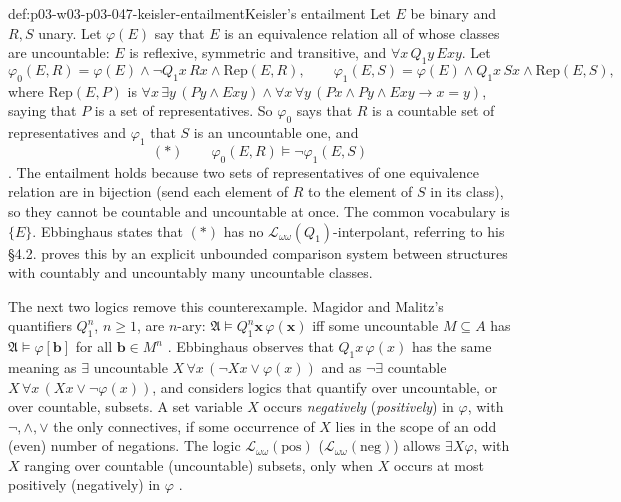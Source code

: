 \begin{hbexample}{def:p03-w03-p03-047-keisler-entailment}{Keisler's entailment}
Let \(E\) be binary and \(R,S\) unary.  Let \(\varphi(E)\) say that \(E\) is
an equivalence relation all of whose classes are uncountable:
\(E\) is reflexive, symmetric and transitive, and \(\forall x\,Q_1y\,Exy\).
Let
\[
 \varphi_0(E,R)=\varphi(E)\land\neg Q_1x\,Rx\land\mathrm{Rep}(E,R),\qquad
 \varphi_1(E,S)=\varphi(E)\land Q_1x\,Sx\land\mathrm{Rep}(E,S),
\]
where \(\mathrm{Rep}(E,P)\) is
\(\forall x\,\exists y\,(Py\land Exy)\land\forall x\,\forall y\,(Px\land Py\land Exy\to x=y)\),
saying that \(P\) is a set of representatives.  So \(\varphi_0\) says that
\(R\) is a countable set of representatives and \(\varphi_1\) that \(S\) is
an uncountable one, and
\[
 (\ast)\qquad \varphi_0(E,R)\models\neg\varphi_1(E,S)
\]
\cite[Ch.~II, \S2.2, p.~35]{Ebbinghaus1985ExtendedLogics}.  The entailment
holds because two sets of representatives of one equivalence relation are in
bijection (send each element of \(R\) to the element of \(S\) in its class),
so they cannot be countable and uncountable at once.  The common vocabulary
is \(\{E\}\).  Ebbinghaus states that \((\ast)\) has no
\(\mathscr L_{\omega\omega}(Q_1)\)-interpolant, referring to his \S4.2.
 proves this by an explicit
unbounded comparison system between structures with countably and
uncountably many uncountable classes.
\end{hbexample}

The next two logics remove this counterexample.  Magidor and Malitz's
quantifiers \(Q_1^n\), \(n\ge1\), are \(n\)-ary:
\(\mathfrak A\models Q_1^n\mathbf x\,\varphi(\mathbf x)\) iff some uncountable
\(M\subseteq A\) has \(\mathfrak A\models\varphi[\mathbf b]\) for all
\(\mathbf b\in M^n\) \cite[Ch.~II, \S2.2, Example~2, p.~35]{Ebbinghaus1985ExtendedLogics}.
Ebbinghaus observes that \(Q_1x\,\varphi(x)\) has the same meaning as
\(\exists\) uncountable \(X\,\forall x\,(\neg Xx\lor\varphi(x))\) and as
\(\neg\exists\) countable \(X\,\forall x\,(Xx\lor\neg\varphi(x))\), and
considers logics that quantify over uncountable, or over countable, subsets.
A set variable \(X\) occurs \emph{negatively} (\emph{positively}) in \(\varphi\),
with \(\neg,\land,\lor\) the only connectives, if some occurrence of \(X\)
lies in the scope of an odd (even) number of negations.  The logic
\(\mathscr L_{\omega\omega}(\mathrm{pos})\) (\(\mathscr L_{\omega\omega}(\mathrm{neg})\))
allows \(\exists X\varphi\), with \(X\) ranging over countable (uncountable)
subsets, only when \(X\) occurs at most positively (negatively) in \(\varphi\)
\cite[Ch.~II, \S2.2, Example~3, p.~36]{Ebbinghaus1985ExtendedLogics}.

